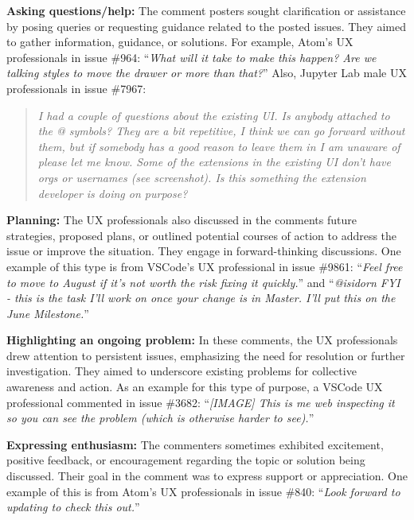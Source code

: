 \addvspace{4pt}
\textbf{Asking questions/help:} The comment posters sought clarification or assistance by posing queries or requesting guidance related to the posted issues. They aimed to gather information, guidance, or solutions. For example, Atom's UX professionals in issue \#964: ``\textit{What will it take to make this happen? Are we talking styles to move the drawer or more than that?}'' Also, Jupyter Lab male UX professionals in issue \#7967:

\begin{quote}
    \textit{I had a couple of questions about the existing UI. Is anybody attached to the @ symbols? They are a bit repetitive, I think we can go forward without them, but if somebody has a good reason to leave them in I am unaware of please let me know. Some of the extensions in the existing UI don't have orgs or usernames (see screenshot). Is this something the extension developer is doing on purpose?}
\end{quote}

\addvspace{4pt}
\textbf{Planning:} The UX professionals also discussed in the comments future strategies, proposed plans, or outlined potential courses of action to address the issue or improve the situation. They engage in forward-thinking discussions. One example of this type is from VSCode's UX professional in issue \#9861: ``\textit{Feel free to move to August if it's not worth the risk fixing it quickly.}'' and ``\textit{@isidorn FYI - this is the task I'll work on once your change is in Master. I'll put this on the June Milestone.}''

\addvspace{4pt}
\textbf{Highlighting an ongoing problem:} In these comments, the UX professionals drew attention to persistent issues, emphasizing the need for resolution or further investigation. They aimed to underscore existing problems for collective awareness and action. As an example for this type of purpose, a VSCode UX professional commented in issue \#3682: ``\textit{[IMAGE] This is me web inspecting it so you can see the problem (which is otherwise harder to see).}''

\addvspace{4pt}
\textbf{Expressing enthusiasm:} The commenters sometimes exhibited excitement, positive feedback, or encouragement regarding the topic or solution being discussed. Their goal in the comment was to express support or appreciation. One example of this is from Atom's UX professionals in issue \#840: ``\textit{Look forward to updating to check this out.}''
